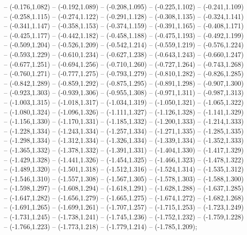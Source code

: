 -- (-0.176,1.082) -- (-0.192,1.089) -- (-0.208,1.095) -- (-0.225,1.102) -- (-0.241,1.109) -- (-0.258,1.115) -- (-0.274,1.122) -- (-0.291,1.128) -- (-0.308,1.135) -- (-0.324,1.141) -- (-0.341,1.147) -- (-0.358,1.153) -- (-0.374,1.159) -- (-0.391,1.165) -- (-0.408,1.171) -- (-0.425,1.177) -- (-0.442,1.182) -- (-0.458,1.188) -- (-0.475,1.193) -- (-0.492,1.199) -- (-0.509,1.204) -- (-0.526,1.209) -- (-0.542,1.214) -- (-0.559,1.219) -- (-0.576,1.224) -- (-0.593,1.229) -- (-0.610,1.234) -- (-0.627,1.238) -- (-0.643,1.243) -- (-0.660,1.247) -- (-0.677,1.251) -- (-0.694,1.256) -- (-0.710,1.260) -- (-0.727,1.264) -- (-0.743,1.268) -- (-0.760,1.271) -- (-0.777,1.275) -- (-0.793,1.279) -- (-0.810,1.282) -- (-0.826,1.285) -- (-0.842,1.289) -- (-0.859,1.292) -- (-0.875,1.295) -- (-0.891,1.298) -- (-0.907,1.300) -- (-0.923,1.303) -- (-0.939,1.306) -- (-0.955,1.308) -- (-0.971,1.311) -- (-0.987,1.313) -- (-1.003,1.315) -- (-1.018,1.317) -- (-1.034,1.319) -- (-1.050,1.321) -- (-1.065,1.322) -- (-1.080,1.324) -- (-1.096,1.326) -- (-1.111,1.327) -- (-1.126,1.328) -- (-1.141,1.329) -- (-1.156,1.330) -- (-1.170,1.331) -- (-1.185,1.332) -- (-1.200,1.333) -- (-1.214,1.333) -- (-1.228,1.334) -- (-1.243,1.334) -- (-1.257,1.334) -- (-1.271,1.335) -- (-1.285,1.335) -- (-1.298,1.334) -- (-1.312,1.334) -- (-1.326,1.334) -- (-1.339,1.334) -- (-1.352,1.333) -- (-1.365,1.332) -- (-1.378,1.332) -- (-1.391,1.331) -- (-1.404,1.330) -- (-1.417,1.329) -- (-1.429,1.328) -- (-1.441,1.326) -- (-1.454,1.325) -- (-1.466,1.323) -- (-1.478,1.322) -- (-1.489,1.320) -- (-1.501,1.318) -- (-1.512,1.316) -- (-1.524,1.314) -- (-1.535,1.312) -- (-1.546,1.310) -- (-1.557,1.308) -- (-1.567,1.305) -- (-1.578,1.303) -- (-1.588,1.300) -- (-1.598,1.297) -- (-1.608,1.294) -- (-1.618,1.291) -- (-1.628,1.288) -- (-1.637,1.285) -- (-1.647,1.282) -- (-1.656,1.279) -- (-1.665,1.275) -- (-1.674,1.272) -- (-1.682,1.268) -- (-1.691,1.265) -- (-1.699,1.261) -- (-1.707,1.257) -- (-1.715,1.253) -- (-1.723,1.249) -- (-1.731,1.245) -- (-1.738,1.241) -- (-1.745,1.236) -- (-1.752,1.232) -- (-1.759,1.228) -- (-1.766,1.223) -- (-1.773,1.218) -- (-1.779,1.214) -- (-1.785,1.209);

